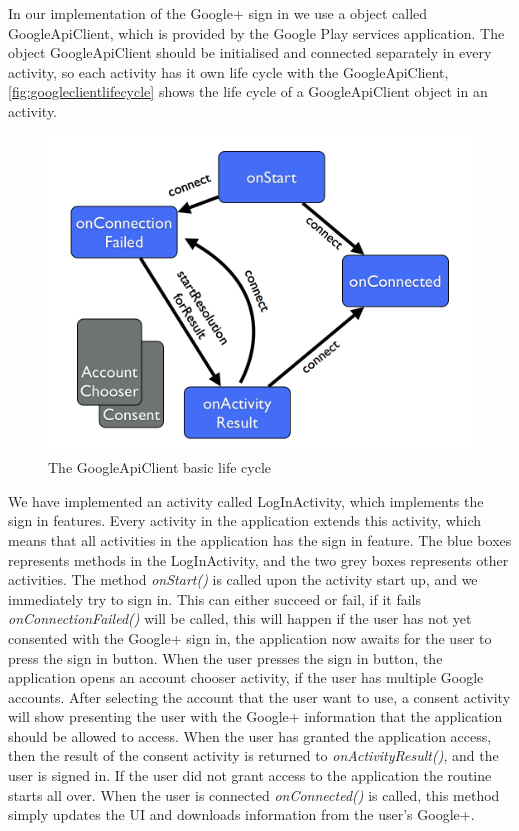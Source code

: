 In our implementation of the Google+ sign in we use a object called \\GoogleApiClient\citep{googleapiclient-docs}, which is provided by the Google Play services application. 
The object GoogleApiClient should be initialised and connected separately in every activity, so each activity has it own life cycle with the GoogleApiClient, \autoref{fig:googleclientlifecycle} shows the life cycle of a GoogleApiClient object in an activity.
\begin{figure}[H]
\centering
\includegraphics[width=0.75\linewidth]{img/googleclientflow.png}
\caption{The GoogleApiClient basic life cycle\cite{googleapiclient-lifecycle}}
\label{fig:googleclientlifecycle}
\end{figure}
We have implemented an activity called LogInActivity, which implements the sign in features. Every activity in the application extends this activity, which means that all activities in the application has the sign in feature. 
The blue boxes represents methods in the LogInActivity, and the two grey boxes represents other activities. The method \textit{onStart()} is called upon the activity start up, and we immediately try to sign in. 
This can either succeed or fail, if it fails \textit{onConnectionFailed()} will be called, this will happen if the user has not yet consented with the Google+ sign in, the application now awaits for the user to press the sign in button. 
When the user presses the sign in button, the application opens an account chooser activity, if the user has multiple Google accounts. 
After selecting the account that the user want to use, a consent activity will show presenting the user with the Google+ information that the application should be allowed to access. 
When the user has granted the application access, then the result of the consent activity is returned to \textit{onActivityResult()}, and the user is signed in. 
If the user did not grant access to the application the routine starts all over. When the user is connected \textit{onConnected()} is called, this method simply updates the UI and downloads information from the user's Google+. 


